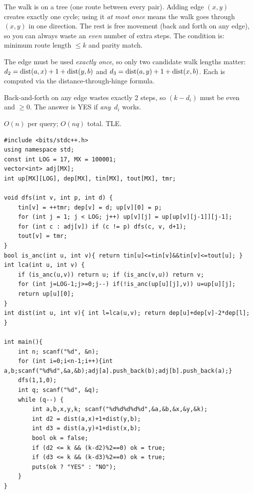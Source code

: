 The walk is on a tree (one route between every pair).  Adding edge \((x,y)\)
creates exactly one cycle; using it \emph{at most once} means the walk
goes through \((x,y)\) in one direction.  The rest is free movement (back
and forth on any edge), so you can always waste an \emph{even} number of
extra steps.  The condition is: minimum route length \(\le k\) and parity
match.

\begin{observation}
The edge must be used \emph{exactly once}, so only two candidate walk
lengths matter:
\(d_2 = \operatorname{dist}(a,x)+1+\operatorname{dist}(y,b)\) and
\(d_3 = \operatorname{dist}(a,y)+1+\operatorname{dist}(x,b)\).
Each is computed via the distance-through-hinge formula.
\end{observation}
\begin{observation}
Back-and-forth on any edge wastes exactly 2 steps, so \((k - d_i)\) must
be even and \(\ge 0\).  The answer is YES if \emph{any}~\(d_i\) works.
\end{observation}

\begin{thinkbox}
{\(O(n)\) per query; \(O(nq)\) total.  TLE.}
\end{thinkbox}

\begin{lstlisting}[caption={CF 1304E full solution (lifting distances + parity)}, label={lst:c11-1304e-soln}]
#include <bits/stdc++.h>
using namespace std;
const int LOG = 17, MX = 100001;
vector<int> adj[MX];
int up[MX][LOG], dep[MX], tin[MX], tout[MX], tmr;

void dfs(int v, int p, int d) {
    tin[v] = ++tmr; dep[v] = d; up[v][0] = p;
    for (int j = 1; j < LOG; j++) up[v][j] = up[up[v][j-1]][j-1];
    for (int c : adj[v]) if (c != p) dfs(c, v, d+1);
    tout[v] = tmr;
}
bool is_anc(int u, int v){ return tin[u]<=tin[v]&&tin[v]<=tout[u]; }
int lca(int u, int v) {
    if (is_anc(u,v)) return u; if (is_anc(v,u)) return v;
    for (int j=LOG-1;j>=0;j--) if(!is_anc(up[u][j],v)) u=up[u][j];
    return up[u][0];
}
int dist(int u, int v){ int l=lca(u,v); return dep[u]+dep[v]-2*dep[l]; }

int main(){
    int n; scanf("%d", &n);
    for (int i=0;i<n-1;i++){int a,b;scanf("%d%d",&a,&b);adj[a].push_back(b);adj[b].push_back(a);}
    dfs(1,1,0);
    int q; scanf("%d", &q);
    while (q--) {
        int a,b,x,y,k; scanf("%d%d%d%d%d",&a,&b,&x,&y,&k);
        int d2 = dist(a,x)+1+dist(y,b);
        int d3 = dist(a,y)+1+dist(x,b);
        bool ok = false;
        if (d2 <= k && (k-d2)%2==0) ok = true;
        if (d3 <= k && (k-d3)%2==0) ok = true;
        puts(ok ? "YES" : "NO");
    }
}
\end{lstlisting}

